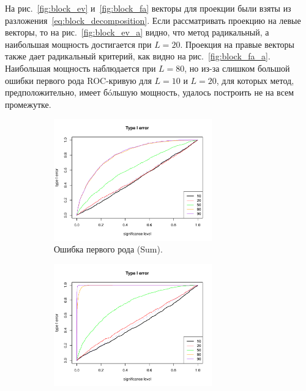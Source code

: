 \documentclass[specialist,
substylefile = spbu_report.rtx,
subf,href,colorlinks=true, 12pt]{disser}
\theoremstyle{definition}
\begin{document}
	На рис.~\ref{fig:block_ev} и~\ref{fig:block_fa} векторы для проекции были взяты из разложения~\eqref{eq:block_decomposition}. Если рассматривать проекцию на левые векторы, то на рис.~\ref{fig:block_ev_a} видно, что метод радикальный, а наибольшая мощность достигается при $L=20$. Проекция на правые векторы также дает радикальный критерий, как видно на рис.~\ref{fig:block_fa_a}. Наибольшая мощность наблюдается при $L=80$, но из-за слишком большой ошибки первого рода ROC-кривую для $L=10$ и $L=20$, для которых метод, предположительно, имеет б\'oльшую мощность, удалось построить не на всем промежутке.
	\begin{figure}
		\captionsetup[subfigure]{justification=Centering}
		\begin{subfigure}[t]{0.45\textwidth}
			\centering
			\includegraphics[width=0.75\textwidth]{type1error_sum_ev.pdf}
			\caption{Ошибка первого рода (Sum).}
			\label{fig:sum_ev_a}
		\end{subfigure}\hspace{\fill}
		\begin{subfigure}[t]{0.45\textwidth}
			\centering
			\includegraphics[width=0.75\textwidth]{type1error_mssa_ev.pdf}

\end{subfigure}
\end{figure}
\end{document}
